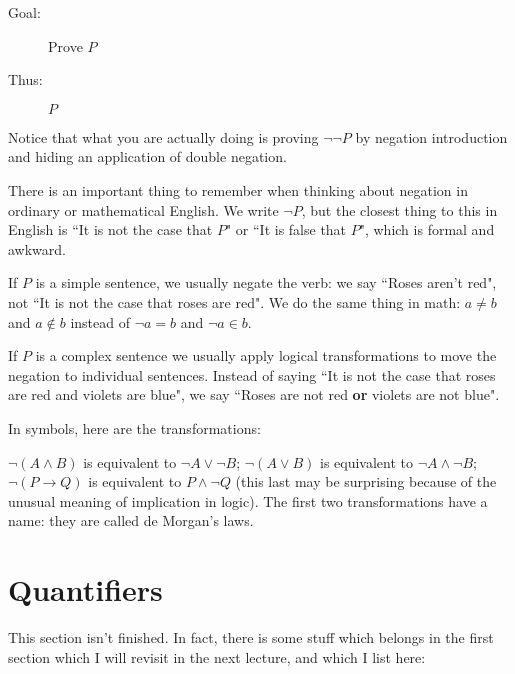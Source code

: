 \documentclass[12pt]{article}
\begin{document}
\begin{description}

\item[Goal:]  Prove $P$

\item[Thus:]  $P$
\end{description}

Notice that what you are actually doing is proving $\neg\neg P$ by negation introduction and hiding an application of double negation.

There is an important thing to remember when thinking about negation in ordinary or mathematical English.  We write $\neg  P$, but the closest thing to this in English is ``It is not the case that $P$" or ``It is false that $P$", which is formal and awkward.

If $P$ is a simple sentence, we usually negate the verb:  we say ``Roses aren't red", not ``It is not the case that roses are red".  We do the same thing in math:  $a \neq b$ and $a \not\in b$ instead of $\neg a=b$ and $\neg a \in b$.

If $P$ is a complex sentence we usually apply logical transformations to move the negation to individual sentences.
Instead of saying ``It is not the case that roses are red and violets are blue", we say ``Roses are not red {\bf or} violets are not blue".

In symbols, here are the transformations:

$\neg(A \wedge B)$ is equivalent to $\neg A \vee \neg B$;  $\neg(A \vee B)$ is equivalent to $\neg A \wedge \neg B$;  $\neg(P \rightarrow Q)$ is equivalent to $P \wedge \neg Q$ (this last may be surprising because of the unusual meaning of implication in logic).  The first two transformations have a name:  they are called de Morgan's laws.

\section{Quantifiers}

This section isn't finished.  In fact, there is some stuff which belongs in the first section which I will revisit in the next lecture, and which I list here:
\end{document}
